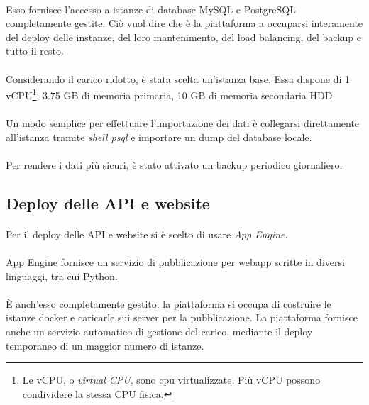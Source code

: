 \documentclass[11pt,a4paper,english]{article}
\begin{document}
\paragraph{} Esso fornisce l'accesso a istanze di database MySQL e PostgreSQL completamente gestite. Ciò vuol dire che è la piattaforma a occuparsi interamente del deploy delle instanze, del loro mantenimento, del load balancing, del backup e tutto il resto. 

\paragraph{} Considerando il carico ridotto, è stata scelta un'istanza base. Essa dispone di 1 vCPU\footnote{Le vCPU, o \emph{virtual CPU}, sono cpu virtualizzate. Più vCPU possono condividere la stessa CPU fisica.}, 3.75 GB di memoria primaria, 10 GB di memoria secondaria HDD.

\paragraph{} Un modo semplice per effettuare l'importazione dei dati è collegarsi direttamente all'istanza tramite \emph{shell psql} e importare un dump del database locale. 
\paragraph{} Per rendere i dati più sicuri, è stato attivato un backup periodico giornaliero.

\subsection{Deploy delle API e website}

\paragraph{} Per il deploy delle API e website si è scelto di usare \emph{App Engine}.

\paragraph{} App Engine fornisce un servizio di pubblicazione per webapp scritte in diversi linguaggi, tra cui Python. 

\paragraph{} È anch'esso completamente gestito: la piattaforma si occupa di costruire le istanze docker e caricarle sui server per la pubblicazione. La piattaforma fornisce anche un servizio automatico di gestione del carico, mediante il deploy temporaneo di un maggior numero di istanze. 
\end{document}
